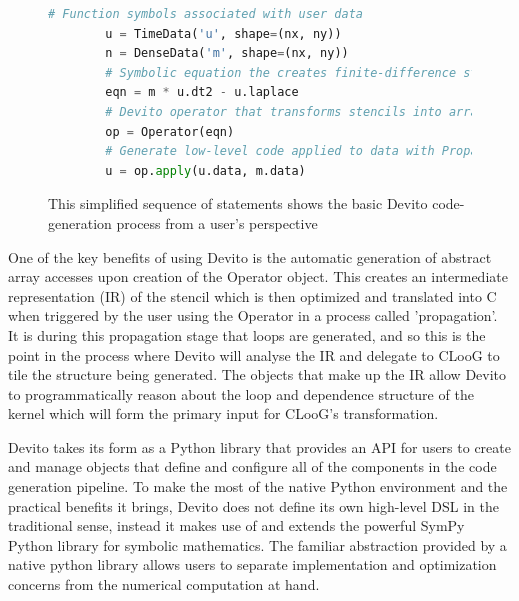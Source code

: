 \documentclass[a4paper,12pt,twoside]{report}
\begin{document}
\begin{figure}[h]
    \begin{lstlisting}[language=Python]
        # Function symbols associated with user data
        u = TimeData('u', shape=(nx, ny))
        n = DenseData('m', shape=(nx, ny))
        # Symbolic equation the creates finite-difference stencils
        eqn = m * u.dt2 - u.laplace
        # Devito operator that transforms stencils into array accesses
        op = Operator(eqn)
        # Generate low-level code applied to data with Propagator
        u = op.apply(u.data, m.data)
    \end{lstlisting}
    \caption{ This simplified sequence of statements shows the basic Devito code-generation process from a user's perspective }
\end{figure}

One of the key benefits of using Devito is the automatic generation of abstract array accesses upon creation of the Operator object. This 
creates an intermediate representation (IR) of the stencil which is then optimized and translated into C when triggered by the user using the Operator
in a process called 'propagation'. It is during this propagation stage that loops are generated, and so this is the point in the process where
Devito will analyse the IR and delegate to CLooG to tile the structure being generated. The objects that make up the IR allow
Devito to programmatically reason about the loop and dependence structure of the kernel which will form the primary input for CLooG's transformation.

Devito takes its form as a Python library that provides an API for users to create and manage objects that define and configure all of the components
in the code generation pipeline. To make the most of the native Python environment and the practical benefits it brings, Devito does not define its 
own high-level DSL in the traditional sense, instead it makes use of and extends the powerful SymPy Python library for symbolic mathematics. 
The familiar abstraction provided by a native python library allows users to separate implementation and optimization concerns from the numerical computation at hand.

\end{document}

